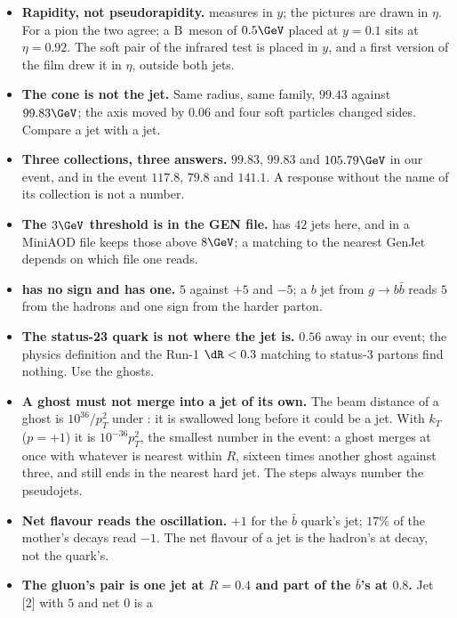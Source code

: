\begin{pitfalls}
\begin{itemize}[nosep]
  \item \textbf{Rapidity, not pseudorapidity.} \antikt measures \dR in
    $y$; the pictures are drawn in $\eta$. For a pion the two agree; a
    B~meson of $0.5\GeV$ placed at $y=0.1$ sits at $\eta=0.92$. The soft
    pair of the infrared test is placed in $y$, and a first version of
    the film drew it in $\eta$, outside both jets.
  \item \textbf{The cone is not the jet.} Same radius, same family,
    $99.43$ against $99.83\GeV$; the axis moved by $0.06$ and four soft
    particles changed sides. Compare a jet with a jet.
  \item \textbf{Three collections, three answers.} $99.83$, $99.83$ and
    $105.79\GeV$ in our event, and in the \CMSSW event $117.8$, $79.8$ and
    $141.1$. A response without the name of its collection is not a
    number.
  \item \textbf{The $3\GeV$ threshold is in the GEN file.} \akfour has
    $42$ jets here, and  in a MiniAOD file keeps
    those above $8\GeV$; a matching to the nearest GenJet depends on
    which file one reads.
  \item \textbf{\hadflav has no sign and \partflav has one.} $5$ against
    $+5$ and $-5$; a $b$ jet from $g\to b\bar b$ reads $5$ from the
    hadrons and one sign from the harder parton.
  \item \textbf{The status-23 quark is not where the jet is.} $0.56$
    away in our event; the physics definition and the Run-1 $\dR<0.3$
    matching to status-3 partons find nothing. Use the ghosts.
  \item \textbf{A ghost must not merge into a jet of its own.} The beam
    distance of a ghost is $10^{36}/p_T^2$ under \antikt: it is swallowed
    long before it could be a jet. With $k_T$ ($p=+1$) it is
    $10^{-36}p_T^2$, the smallest number in the event: a ghost merges at
    once with whatever is nearest within $R$, sixteen times another ghost
    against three, and still ends in the nearest hard jet. The steps
    always number the pseudojets.
  \item \textbf{Net flavour reads the oscillation.} $+1$ for the
    $\bar b$ quark's jet; $17\%$ of the mother's decays read $-1$. The
    net flavour of a jet is the hadron's at decay, not the quark's.
  \item \textbf{The gluon's pair is one jet at $R=0.4$ and part of the
    $\bar b$'s at $0.8$.} Jet [2] with \hadflav $5$ and net $0$ is a

\end{itemize}
\end{pitfalls}
